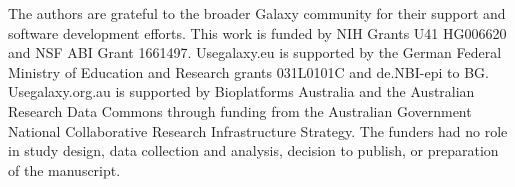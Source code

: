 The authors are grateful to the broader Galaxy community for their
support and software development efforts. This work is funded by NIH
Grants U41 HG006620 and NSF ABI Grant 1661497. Usegalaxy.eu is supported
by the German Federal Ministry of Education and Research grants
031L0101C and de.NBI-epi to BG. Usegalaxy.org.au is supported by
Bioplatforms Australia and the Australian Research Data Commons through
funding from the Australian Government National Collaborative Research
Infrastructure Strategy. The funders had no role in study design, data
collection and analysis, decision to publish, or preparation of the
manuscript.


\footnotesize


\normalsize

